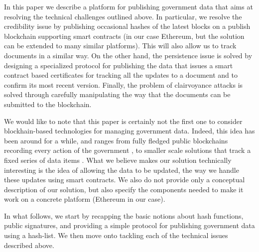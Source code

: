In this paper we describe a platform for publishing government data that aims at resolving the technical challenges outlined above. In particular, 
we resolve the credibility issue by publishing occasional hashes of the latest blocks on a publish blockchain supporting smart contracts (in our case Ethereum, but the solution can be extended to many similar platforms). This will also allow us to track documents in a similar way. On the other hand, the persistence issue is solved by designing a specialized protocol for publishing the data that issues a smart contract based certificates for tracking all the updates to a document and to confirm its most recent version. Finally, the problem of clairvoyance attacks is solved through carefully manipulating the way that the documents can be submitted to the blockchain.

We would like to note that this paper is certainly not the first one to consider blockhain-based technologies for managing government data. Indeed, this idea has been around for a while, and ranges from fully fledged public blockchains recording every action of the government \cite{eushit,ibmshit}, to smaller scale solutions that track a fixed series of data items \cite{energiaabierta}. What we believe makes our solution technically interesting is the idea of allowing the data to be updated, the way we handle these updates using smart contracts. We also do not provide only a conceptual description of our solution, but also specify the components needed to make it work on a concrete platform (Ethereum in our case).

In what follows, we start by recapping the basic notions about hash functions, public signatures, and providing a simple protocol for publishing government data using a hash-list. We then move onto tackling each of the technical issues described above.